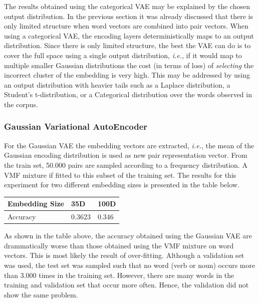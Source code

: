 \documentclass[11pt]{scrartcl}
\newcommand{\ie}{\textit{i.e.}}
\begin{document}
The results obtained using the categorical VAE may be explained by the
chosen output distribution. In the previous section it was already
discussed that there is only limited structure when word vectors are
combined into pair vectors. When using a categorical VAE, the encoding
layers deterministically maps to an output distribution. Since there
is only limited structure, the best the VAE can do is to cover the
full space using a single output distribution, \ie, if it would map to
multiple smaller Gaussian distributions the cost (in terms of loss) of
\textit{selecting} the incorrect cluster of the embedding is very
high. This may be addressed by using an output distribution with
heavier tails such as a Laplace distribution, a Student's
t-distribution, or a Categorical distribution over the words observed
in the corpus.

\subsubsection{Gaussian Variational AutoEncoder}
For the Gaussian VAE the embedding vectors are extracted, \ie, the
mean of the Gaussian encoding distribution is used as new pair
representation vector. From the train set, 50.000 pairs are sampled
according to a frequency distribution. A VMF mixture if fitted to this
subset of the training set. The results for this experiment for two different
embedding sizes is presented in the table below.

\begin{center}
\begin{tabular}{@{}lll@{}}
\toprule
Embedding Size & 35D    & 100D \\ \midrule
Accuracy       & 0.3623 & 0.346    \\ \bottomrule
\end{tabular}
\end{center}

As shown in the table above, the accuracy obtained using the Gaussian
VAE are drammatically worse than those obtained using the VMF mixture
on word vectors. This is most likely the result of
over-fitting. Although a validation set was used, the test set was
sampled such that no word (verb or noun) occurs more than 3.000 times
in the training set. However, there are many words in the training and
validation set that occur more often. Hence, the validation did not
show the same problem.
\end{document}
